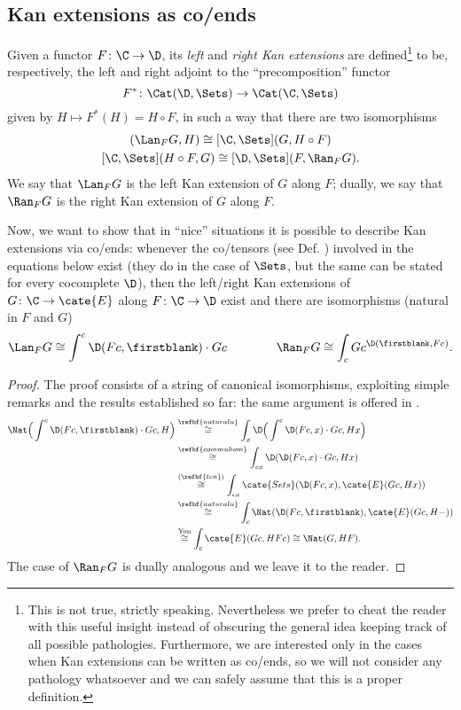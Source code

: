 \subsection{Kan extensions as co/ends}
\begin{definition}\label{kann}
Given a functor $F\colon \C\to \D$, its \emph{left} and \emph{right Kan extensions} are defined\footnote{This is not true, strictly speaking. Nevertheless we prefer to cheat the reader with this useful insight instead of obscuring the general idea keeping track of all possible pathologies. Furthermore, we are interested only in the cases when Kan extensions can be written as co/ends, so we will not consider any pathology whatsoever and we can safely assume that this is a proper definition.} to be, respectively, the left and right adjoint to the ``precomposition'' functor
\[
F^*\colon \Cat(\D,\Sets)\to \Cat(\C,\Sets)
\]
given by $H\mapsto F^*(H)=H\circ F$, in such a way that there are two  
isomorphisms
\begin{gather*}
[\D,\Sets](\Lan_FG,H)\cong [\C,\Sets](G, H\circ F)\\
[\C,\Sets](H\circ F,G)\cong [\D,\Sets](F, \Ran_FG).
\end{gather*}
We say that $\Lan_FG$ is the left Kan extension of $G$ along $F$; dually, we say that $\Ran_FG$ is the right Kan extension of $G$ along $F$.
\end{definition}
Now, we want to show that in ``nice'' situations it is possible to describe Kan extensions via co/ends: whenever the co/tensors (see Def. ) involved in the equations below exist (they do in the case of $\Sets$, but the same can be stated for every cocomplete $\D$), then the left/right Kan extensions of $G\colon \C\to\cate{E}$ along $F\colon \C\to \D$ exist and there are isomorphisms (natural in $F$ and $G$)
\[\label{kanend}
\Lan_FG\cong \int^c \D(Fc,\firstblank)\cdot Gc\qquad\qquad 
\Ran_FG\cong \int_c Gc^{\D(\firstblank,Fc)}.
\]
\begin{proof}
The proof consists of a string of canonical isomorphisms, exploiting simple remarks and the results established so far: the same argument is offered in \cite[Thm\@. \textbf{X.4.1, 2}]{McL}.
\begin{align*}
\Nat\Big( \int^c \D(Fc,\firstblank)\cdot Gc,H\Big)&\overset{\refbf{naturalu}}{\cong} \int_x\D\Big( \int^c \D(Fc,x)\cdot Gc,Hx \Big)\\
&\overset{\refbf{commuhom}}{\cong} \int_{cx}\D(\D(Fc,x)\cdot Gc,Hx)\\
&\overset{(\refbf{ten})}{\cong} \int_{cx}\cate{Sets}(\D(Fc,x),\cate{E}(Gc,Hx))\\
&\overset{\refbf{naturalu}}{\cong}\int_c\Nat(\D(Fc,\firstblank),\cate{E}(Gc,H-))\\
&\overset{\text{Yon}}{\cong} \int_c \cate{E}(Gc,HFc)\cong\Nat(G,HF).
\end{align*}
The case of $\Ran_FG$ is dually analogous and we leave it to the reader.
\end{proof}
